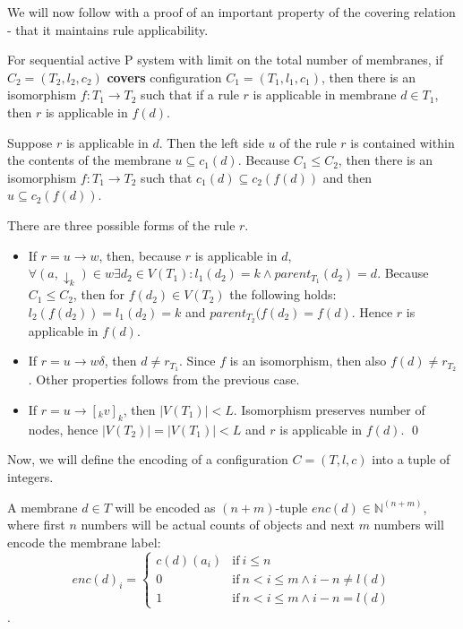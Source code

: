 We will now follow with a proof of an important property of the covering relation - that it maintains rule applicability.

\begin{lemma}
\label{rule_applicability_lemma}
  For sequential active P system with limit on the total number of membranes, if $C_2 = (T_2, l_2, c_2)$ {\bf covers} configuration $C_1 = (T_1, l_1, c_1)$, then there is an isomorphism $f: T_1\rightarrow T_2$ such that if a rule $r$ is applicable in membrane $d\in T_1$, then $r$ is applicable in $f(d)$.
\end{lemma}

\begin{dokaz}
  Suppose $r$ is applicable in $d$. Then the left side $u$ of the rule $r$ is contained within the contents of the membrane $u\subseteq c_1(d)$. Because $C_1\leq C_2$, then there is an isomorphism $f:T_1\rightarrow T_2$ such that $c_1(d)\subseteq c_2(f(d))$ and then $u\subseteq c_2(f(d))$.

  There are three possible forms of the rule $r$.
  \begin{itemize}
    \item If $r = u\rightarrow w$, then, because $r$ is applicable in $d$, $\forall (a,\downarrow_k)\in w \exists d_2\in V(T_1): l_1(d_2)=k \wedge parent_{T_1}(d_2) = d$. Because $C_1\leq C_2$, then for $f(d_2)\in V(T_2)$ the following holds: $l_2(f(d_2)) = l_1(d_2) = k$ and $parent_{T_2}(f(d_2) = f(d)$. Hence $r$ is applicable in $f(d)$.
    \item If $r = u\rightarrow w\delta$, then $d\neq r_{T_1}$. Since $f$ is an isomorphism, then also $f(d)\neq r_{T_2}$. Other properties follows from the previous case.
    \item If $r = u\rightarrow [_k v]_k$, then $|V(T_1)|<L$. Isomorphism preserves number of nodes, hence $|V(T_2)| = |V(T_1)| < L$ and $r$ is applicable in $f(d)$. \qed
  \end{itemize}
\end{dokaz}

Now, we will define the encoding of a configuration $C = (T, l, c)$ into a tuple of integers.

A membrane $d\in T$ will be encoded as $(n+m)$-tuple $enc(d)\in\mathbb N^{(n+m)}$, where first $n$ numbers will be actual counts of objects and next $m$ numbers will encode the membrane label:
\[
  enc(d)_{i} =
  \begin{cases}
    c(d)(a_i) & \text{if}\ i\leq n\\
    0 & \text{if}\ n<i\leq m\wedge i-n\neq l(d)\\
    1 & \text{if}\ n<i\leq m\wedge i-n=l(d)
  \end{cases}
\].

